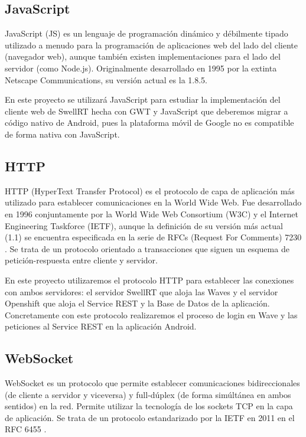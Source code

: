     \subsection{JavaScript}\label{ssec:javascript}
    
	JavaScript \cite{ref:javascript} (JS) es un lenguaje de programación dinámico y débilmente tipado utilizado a menudo para la programación de aplicaciones web del lado del cliente (navegador web), aunque también existen implementaciones para el lado del servidor (como Node.js). Originalmente desarrollado en 1995 por la extinta Netscape Communications, su versión actual es la 1.8.5.  
	
	En este proyecto se utilizará JavaScript para estudiar la implementación del cliente web de SwellRT hecha con GWT y JavaScript que deberemos migrar a código nativo de Android, pues la plataforma móvil de Google no es compatible de forma nativa con JavaScript.
    
    \subsection{HTTP}\label{ssec:HTTP}
    
	HTTP \cite{ref:HTTP} (HyperText Transfer Protocol) es el protocolo de capa de aplicación más utilizado para establecer comunicaciones en la World Wide Web. Fue desarrollado en 1996 conjuntamente por la World Wide Web Consortium (W3C) y el Internet Engineering Taskforce (IETF), aunque la definición de su versión más actual (1.1) se encuentra especificada en la serie de RFCs (Request For Comments) 7230 \cite{ref:HTTP}. Se trata de un protocolo orientado a transacciones que siguen un esquema de petición-respuesta entre cliente y servidor. 
	
	En este proyecto utilizaremos el protocolo HTTP para establecer las conexiones con ambos servidores: el servidor SwellRT que aloja las Waves y el servidor Openshift que aloja el Service REST y la Base de Datos de la aplicación. Concretamente con este protocolo realizaremos el proceso de login en Wave y las peticiones al Service REST en la aplicación Android.
    
    \subsection{WebSocket}\label{ssec:websocket}
    
	WebSocket \cite{ref:webSocket_ref} es un protocolo que permite establecer comunicaciones bidireccionales (de cliente a servidor y viceversa) y full-dúplex (de forma simúltánea en ambos sentidos) en la red. Permite utilizar la tecnología de los sockets TCP en la capa de aplicación.  Se trata de un protocolo estandarizado por la IETF en 2011 en el RFC 6455 \cite{ref:webSocket_ref}. 
	
